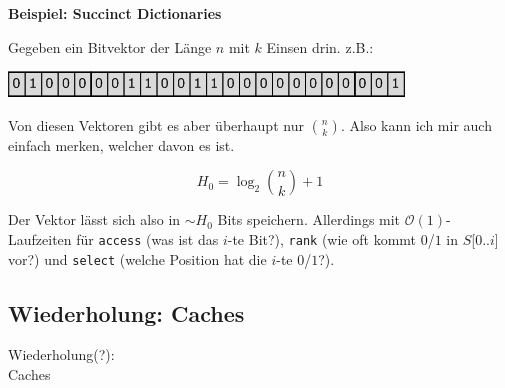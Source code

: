 \documentclass{beamer}
\begin{document}

\begin{frame}

\textbf{Beispiel: Succinct Dictionaries}
\bigskip

Gegeben ein Bitvektor der Länge $n$ mit $k$ Einsen drin. z.B.:

\begin{center}
\includegraphics[scale=0.751]{bitvector.png} 
\end{center}
\pause

Von diesen Vektoren gibt es aber überhaupt nur $\binom{n}{k}$. Also kann ich mir auch einfach merken, welcher davon es ist.\pause

$$H_0 = \log_2{\binom{n}{k}} + 1$$

Der Vektor lässt sich also in $\sim H_0$ Bits speichern.\pause
Allerdings mit $\mathcal{O}(1)$-Laufzeiten für \texttt{access} (was ist das $i$-te Bit?), \texttt{rank} (wie oft kommt $0$/$1$ in $S$[0..$i$] vor?) und \texttt{select} (welche Position hat die $i$-te $0$/$1$?).
\end{frame}


\subsection{Wiederholung: Caches}

\begin{frame}
\Large
\begin{center}
Wiederholung(?):\\
Caches
\end{center}
\normalsize
\end{frame}

\end{document}

